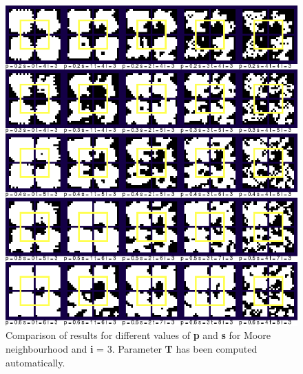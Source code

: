 \documentclass[a4paper, 11pt]{article} %
\begin{document}
\begin{figure}[ht]
	\centering
	\includegraphics[width=1.\textwidth]{moore_sp}
	\caption{Comparison of results for different values of \textbf{p} and \textbf{s} for Moore neighbourhood and \textbf{i} = 3. Parameter \textbf{T} has been computed automatically.}
	\label{fig:results3}
\end{figure}
\end{document}
